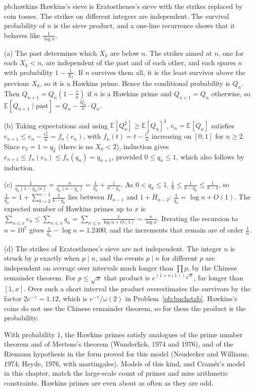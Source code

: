 \begin{solution}{pb:hawkins}
\idea Hawkins's sieve is Eratosthenes's sieve with the strikes replaced by coin tosses. The strikes on different integers are independent. The survival probability of $n$ is the sieve product, and a one-line recurrence shows that it behaves like $\frac1{\log n}$.

\writeup (a) The past determines which $X_k$ are below $n$. The strikes aimed at $n$, one for each $X_k<n$, are independent of the past and of each other, and each spares $n$ with probability
$1-\frac1{X_k}$. If $n$ survives them all, it is the least survivor above the previous $X_k$, so it is a Hawkins prime. Hence the conditional probability is $Q_n$. Then $Q_{n+1}=Q_n(1-\frac1n)$
if $n$ is a Hawkins prime and $Q_{n+1}=Q_n$ otherwise, so $\mathbb E[Q_{n+1}\mid\text{past}]=Q_n-\frac{Q_n}n\cdot Q_n$.

(b) Taking expectations and using $\mathbb E[Q_n^2]\ge\mathbb E[Q_n]^2$, $e_n=\mathbb E[Q_n]$ satisfies $e_{n+1}\le e_n-\frac{e_n^2}n=f_n(e_n)$, with $f_n(t)=t-\frac{t^2}n$ increasing on
$[0,1]$ for $n\ge2$. Since $e_2=1=q_2$ (there is no $X_k<2$), induction gives $e_{n+1}\le f_n(e_n)\le f_n(q_n)=q_{n+1}$, provided $0\le q_n\le1$, which also follows by induction.

(c) $\frac1{q_n(1-q_n/n)}=\frac n{q_n(n-q_n)}=\frac1{q_n}+\frac1{n-q_n}$. As $0<q_k\le1$, $\frac1k\le\frac1{k-q_k}\le\frac1{k-1}$, so $\frac1{q_n}=1+\sum_{k=2}^{n-1}\frac1{k-q_k}$ lies
between $H_{n-1}$ and $1+H_{n-2}$: $\frac1{q_n}=\log n+O(1)$. The expected number of Hawkins primes up to $x$ is $\sum_{n\le x}e_n\le\sum_{n\le x}q_n=\sum_{n\le x}\frac1{\log n+O(1)}\sim\frac x{\log x}$.
Iterating the recursion to $n=10^7$ gives $\frac1{q_n}-\log n=1.2400$, and the increments that remain are of order $\frac1n$.

(d) The strikes of Eratosthenes's sieve are not independent. The integer $n$ is struck by $p$ exactly when $p\mid n$, and the events $p\mid n$ for different $p$ are independent on average over
intervals much longer than $\prod p$, by the Chinese remainder theorem. For $p\le\sqrt x$ that product is $e^{(1+o(1))\sqrt x}$, far longer than $[1,x]$. Over such a short
interval the product overestimates the survivors by the factor $2e^{-\gamma}=1.12$, which is $e^{-\gamma}/\omega(2)$ in Problem~\ref{pb:buchstab}. Hawkins's coins do not use the Chinese remainder theorem, so for them the product is the probability.

\leads With probability $1$, the Hawkins primes satisfy analogues of the prime number theorem and of Mertens's theorem (Wunderlich, 1974 and 1976), and of the Riemann
hypothesis in the form proved for this model (Neudecker and Williams, 1974; Heyde, 1976, with martingales). Models of this kind, and Cramér's model in this chapter, match the large-scale count of primes and miss arithmetic constraints. Hawkins primes are even about as often as they are odd.
\end{solution}

